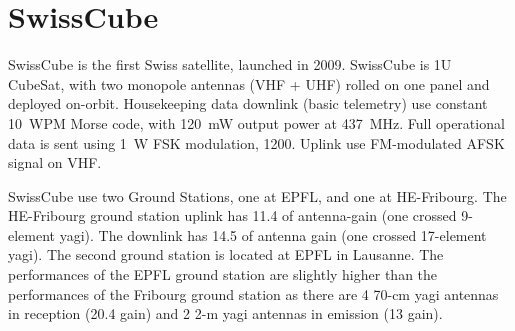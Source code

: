 \section{SwissCube}
SwissCube is the first Swiss satellite, launched in 2009. SwissCube is 1U CubeSat, with two monopole antennas (VHF + UHF) rolled on one panel and deployed on-orbit. Housekeeping data downlink (basic telemetry) use constant \si{10}~WPM Morse code, with \SI{120}{\milli\watt} output power at \SI{437}{\MHz}. Full operational data is sent using \SI{1}{\watt} FSK modulation, \SI{1200}{\bps}. Uplink use FM-modulated AFSK signal on VHF. 

SwissCube use two Ground Stations, one at EPFL, and one at HE-Fribourg. The HE-Fribourg ground station uplink has \SI{11.4}{\dBi} of antenna-gain (one crossed \si{9}-element yagi). The downlink has \SI{14.5}{\dBi} of antenna gain (one crossed \si{17}-element yagi). The second ground station is located at EPFL in Lausanne. The performances of the EPFL ground station are slightly higher than the performances of the Fribourg ground station as there are \si{4} \si{70}-cm yagi antennas in reception (\SI{20.4}{\dBi} gain) and \si{2} \si{2}-m yagi antennas in emission (\SI{13}{\dBi} gain). \cite{swisscube_groundstation}

